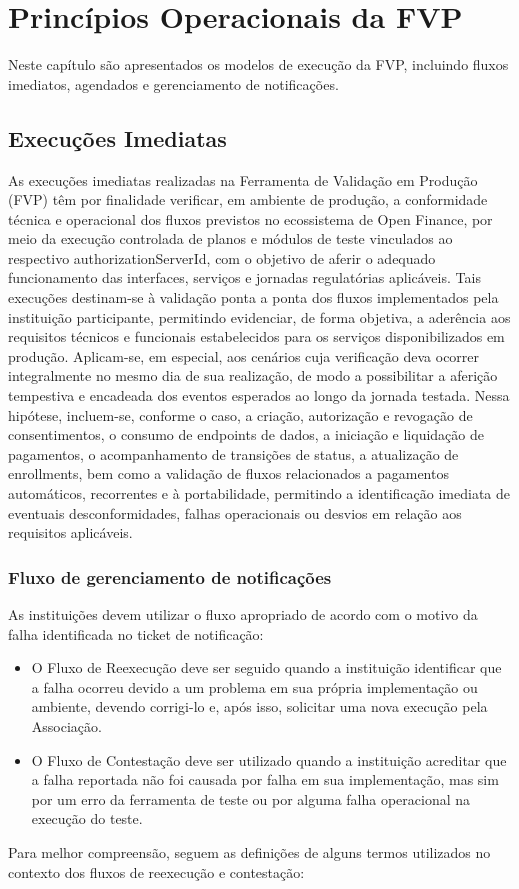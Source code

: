 \chapter{Princípios Operacionais da FVP}

Neste capítulo são apresentados os modelos de execução da FVP, incluindo fluxos imediatos, agendados e gerenciamento de notificações.

\section{Execuções Imediatas}
As execuções imediatas realizadas na Ferramenta de Validação em Produção (FVP) têm por finalidade verificar, em ambiente de produção, a conformidade técnica e operacional dos fluxos previstos no ecossistema de Open Finance, por meio da execução controlada de planos e módulos de teste vinculados ao respectivo authorizationServerId, com o objetivo de aferir o adequado funcionamento das interfaces, serviços e jornadas regulatórias aplicáveis. Tais execuções destinam-se à validação ponta a ponta dos fluxos implementados pela instituição participante, permitindo evidenciar, de forma objetiva, a aderência aos requisitos técnicos e funcionais estabelecidos para os serviços disponibilizados em produção.
\medskip
Aplicam-se, em especial, aos cenários cuja verificação deva ocorrer integralmente no mesmo dia de sua realização, de modo a possibilitar a aferição tempestiva e encadeada dos eventos esperados ao longo da jornada testada. Nessa hipótese, incluem-se, conforme o caso, a criação, autorização e revogação de consentimentos, o consumo de endpoints de dados, a iniciação e liquidação de pagamentos, o acompanhamento de transições de status, a atualização de enrollments, bem como a validação de fluxos relacionados a pagamentos automáticos, recorrentes e à portabilidade, permitindo a identificação imediata de eventuais desconformidades, falhas operacionais ou desvios em relação aos requisitos aplicáveis.

\subsection{Fluxo de gerenciamento de notificações}

As instituições devem utilizar o fluxo apropriado de acordo com o motivo da falha identificada no ticket de notificação:
\begin{itemize}
    \item O Fluxo de Reexecução deve ser seguido quando a instituição identificar que a falha ocorreu devido a um problema em sua própria implementação ou ambiente, devendo corrigi-lo e, após isso, solicitar uma nova execução pela Associação.
    \item O Fluxo de Contestação deve ser utilizado quando a instituição acreditar que a falha reportada não foi causada por falha em sua implementação, mas sim por um erro da ferramenta de teste ou por alguma falha operacional na execução do teste.
\end{itemize}
Para melhor compreensão, seguem as definições de alguns termos utilizados no contexto dos fluxos de reexecução e contestação:

